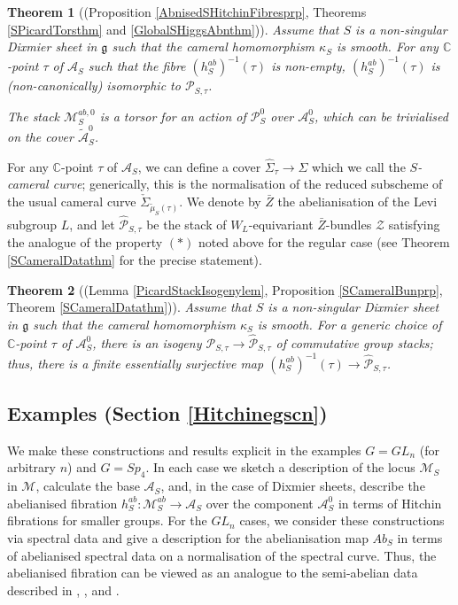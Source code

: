 \documentclass{amsart}
\newtheorem{theorem}{Theorem}
\theoremstyle{remark}
\numberwithin{theorem}{section}
\numberwithin{equation}{section}
\begin{document}
\begin{theorem}[(Proposition \ref{AbnisedSHitchinFibresprp}, Theorems \ref{SPicardTorsthm} and \ref{GlobalSHiggsAbnthm})]\label{IntroNonabnabnthm}
    Assume that $S$ is a non-singular Dixmier sheet in $\mathfrak{g}$ such that the cameral homomorphism $\kappa_S$ is smooth. For any $\mathbb{C}$-point $\tau$ of $\mathcal A_S$ such that the fibre $(h_S^{ab})^{-1}(\tau)$ is non-empty, $(h_S^{ab})^{-1}(\tau)$ is (non-canonically) isomorphic to $\mathcal P_{S,\tau}$.

    The stack $\mathcal M_S^{ab,0}$ is a torsor for an action of $\mathcal P_S^0$ over $\mathcal A_S^0$, which can be trivialised on the cover $\tilde{\mathcal A}_S^0$.
\end{theorem}

For any $\mathbb{C}$-point $\tau$ of $\mathcal A_S$, we can define a cover $\hat\Sigma_\tau \rightarrow \Sigma$ which we call the \emph{$S$-cameral curve}; generically, this is the normalisation of the reduced subscheme of the usual cameral curve $\check{\Sigma}_{\tilde{\mu}_S(\tau)}$. We denote by $\bar{Z}$ the abelianisation of the Levi subgroup $L$, and let $\hat{\mathcal P}_{S,\tau}$ be the stack of $W_L$-equivariant $\bar{Z}$-bundles $\mathcal Z$ satisfying the analogue of the property $(*)$ noted above for the regular case (see Theorem \ref{SCameralDatathm} for the precise statement).

\begin{theorem}[(Lemma \ref{PicardStackIsogenylem}, Proposition \ref{SCameralBunprp}, Theorem \ref{SCameralDatathm})]\label{IntroSCamDatathm}
    Assume that $S$ is a non-singular Dixmier sheet in $\mathfrak{g}$ such that the cameral homomorphism $\kappa_S$ is smooth. For a generic choice of $\mathbb{C}$-point $\tau$ of $\mathcal A_S^0$, there is an isogeny $\mathcal P_{S,\tau} \rightarrow \hat{\mathcal P}_{S,\tau}$ of commutative group stacks; thus, there is a finite essentially surjective map $(h_S^{ab})^{-1}(\tau) \rightarrow \hat{\mathcal P}_{S,\tau}$.
\end{theorem}

\subsection*{Examples (Section \ref{Hitchinegscn})}
We make these constructions and results explicit in the examples $G = GL_n$ (for arbitrary $n$) and $G=Sp_4$. In each case we sketch a description of the locus $\mathcal M_S$ in $\mathcal M$, calculate the base $\mathcal A_S$, and, in the case of Dixmier sheets, describe the abelianised fibration $h_S^{ab}:\mathcal M_S^{ab} \rightarrow \mathcal A_S$ over the component $\mathcal A_S^0$ in terms of Hitchin fibrations for smaller groups. For the $GL_n$ cases, we consider these constructions via spectral data and give a description for the abelianisation map $Ab_S$ in terms of abelianised spectral data on a normalisation of the spectral curve. Thus, the abelianised fibration can be viewed as an analogue to the semi-abelian data described in \cite{Hitchin4}, \cite{Horn1}, \cite{Horn2} and \cite{FraPN}.
\end{document}
